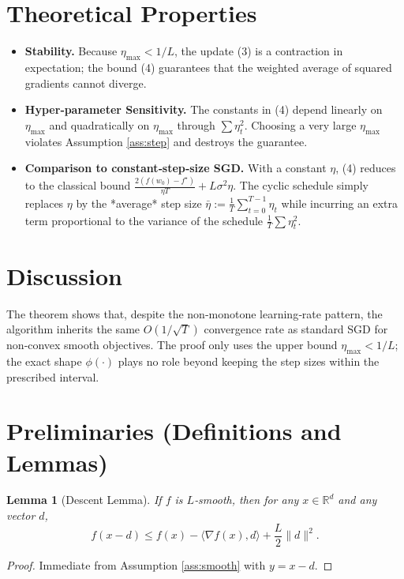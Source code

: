 \documentclass{article}
\newtheorem{lemma}{Lemma}
\newcommand{\RR}{\mathbb{R}}
\begin{document}
\section*{Theoretical Properties}
\begin{itemize}
\item \textbf{Stability.} Because $\eta_{\max}<1/L$, the update (3) is a contraction in expectation; the bound (4) guarantees that the weighted average of squared gradients cannot diverge.
\item \textbf{Hyper‑parameter Sensitivity.} The constants in (4) depend linearly on $\eta_{\max}$ and quadratically on $\eta_{\max}$ through $\sum\eta_t^{2}$. Choosing a very large $\eta_{\max}$ violates Assumption \ref{ass:step} and destroys the guarantee.
\item \textbf{Comparison to constant‑step‑size SGD.} With a constant $\eta$, (4) reduces to the classical bound
$\frac{2(f(w_0)-f^\star)}{\eta T}+L\sigma^2\eta$.
The cyclic schedule simply replaces $\eta$ by the *average* step size
$\bar\eta:=\frac{1}{T}\sum_{t=0}^{T-1}\eta_t$ while incurring an extra term proportional to the variance of the schedule $\frac{1}{T}\sum\eta_t^{2}$.
\end{itemize}

\section*{Discussion}
The theorem shows that, despite the non‑monotone learning‑rate pattern,
the algorithm inherits the same $O(1/\sqrt{T})$ convergence rate as standard SGD for non‑convex smooth objectives. The proof only uses the upper bound $\eta_{\max}<1/L$; the exact shape $\phi(\cdot)$ plays no role beyond keeping the step sizes within the prescribed interval.

\newpage

\section*{Preliminaries (Definitions and Lemmas)}
\begin{lemma}[Descent Lemma]\label{lem:descent}
If $f$ is $L$‑smooth, then for any $x\in\RR^d$ and any vector $d$,
\[
f(x-d)\le f(x)-\langle\nabla f(x),d\rangle+\frac{L}{2}\|d\|^2 .
\]
\end{lemma}
\begin{proof}
Immediate from Assumption \ref{ass:smooth} with $y=x-d$.
\end{proof}
\end{document}
